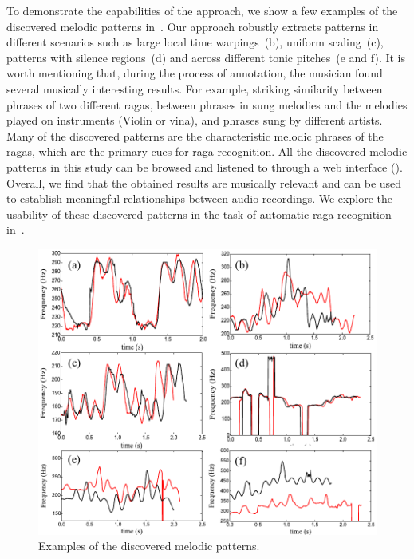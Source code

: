To demonstrate the capabilities of the approach, we show a few examples of the discovered melodic patterns in~. Our approach robustly extracts patterns in different scenarios such as large local time warpings~(b), uniform scaling~(c), patterns with silence regions~(d) and across different tonic pitches~(e and f). It is worth mentioning that, during the process of annotation, the musician found several musically interesting results. For example, striking similarity between phrases of two different \glspl{raga}, between phrases in sung melodies and the melodies played on instruments (Violin or \Gls{vina}), and phrases sung by different artists. Many of the discovered patterns are the characteristic melodic phrases of the \glspl{raga}, which are the primary cues for \gls{raga} recognition. All the discovered melodic patterns in this study can be browsed and listened to through a web interface (). Overall, we find that the obtained results are musically relevant and can be used to establish meaningful relationships between audio recordings. We explore the usability of these discovered patterns in the task of automatic \gls{raga} recognition in~.
\begin{figure}
	\begin{center}
		\includegraphics[width=\figSizeHundred]{ch06_patterns/figures/discovery/combinedPatterns.pdf}
	\end{center}
	\caption{Examples of the discovered melodic patterns.}
	\label{fig:combinedPatternsDiscovered}
\end{figure}

